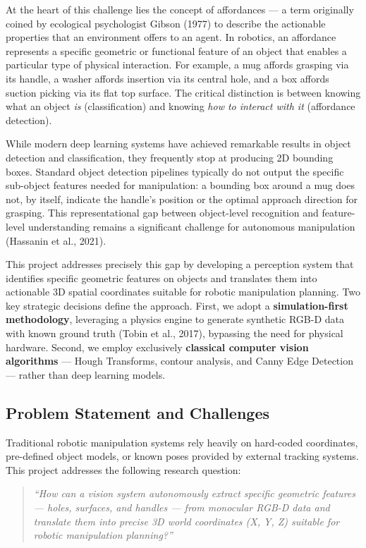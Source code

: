 \documentclass[11pt,a4paper]{article}
\begin{document}
At the heart of this challenge lies the concept of affordances --- a term originally coined by ecological psychologist Gibson (1977) to describe the actionable properties that an environment offers to an agent. In robotics, an affordance represents a specific geometric or functional feature of an object that enables a particular type of physical interaction. For example, a mug affords grasping via its handle, a washer affords insertion via its central hole, and a box affords suction picking via its flat top surface. The critical distinction is between knowing what an object \textit{is} (classification) and knowing \textit{how to interact with it} (affordance detection).

While modern deep learning systems have achieved remarkable results in object detection and classification, they frequently stop at producing 2D bounding boxes. Standard object detection pipelines typically do not output the specific sub-object features needed for manipulation: a bounding box around a mug does not, by itself, indicate the handle's position or the optimal approach direction for grasping. This representational gap between object-level recognition and feature-level understanding remains a significant challenge for autonomous manipulation (Hassanin et al., 2021).

This project addresses precisely this gap by developing a perception system that identifies specific geometric features on objects and translates them into actionable 3D spatial coordinates suitable for robotic manipulation planning. Two key strategic decisions define the approach. First, we adopt a \textbf{simulation-first methodology}, leveraging a physics engine to generate synthetic RGB-D data with known ground truth (Tobin et al., 2017), bypassing the need for physical hardware. Second, we employ exclusively \textbf{classical computer vision algorithms} --- Hough Transforms, contour analysis, and Canny Edge Detection --- rather than deep learning models.

\subsection{Problem Statement and Challenges}

Traditional robotic manipulation systems rely heavily on hard-coded coordinates, pre-defined object models, or known poses provided by external tracking systems. This project addresses the following research question:

\begin{quote}
\textit{``How can a vision system autonomously extract specific geometric features --- holes, surfaces, and handles --- from monocular RGB-D data and translate them into precise 3D world coordinates (X, Y, Z) suitable for robotic manipulation planning?''}
\end{quote}
\end{document}
